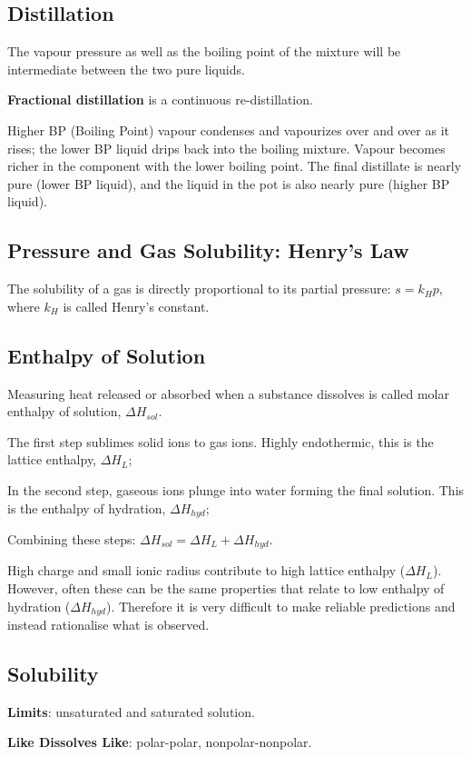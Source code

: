 \documentclass[a4paper,12pt]{article}
\begin{document}
\subsection{Distillation}
The vapour pressure as well as the boiling point of the mixture will be intermediate between the two pure liquids.\par
\textbf{Fractional distillation} is a continuous re-distillation. \par
Higher BP (Boiling Point) vapour condenses and vapourizes over and over as it rises; the lower BP liquid drips back into the boiling mixture.
Vapour becomes richer in the component with the lower boiling point. The final distillate is nearly pure (lower BP liquid), and the liquid in the pot is also nearly pure (higher BP liquid).
\subsection{Pressure and Gas Solubility: Henry's Law}
The solubility of a gas is directly proportional to its partial pressure: $s = k_{H}p$, where $k_{H}$ is called Henry's constant.
\subsection{Enthalpy of Solution}
Measuring heat released or absorbed when a substance dissolves is called molar enthalpy of solution, $\Delta H_{sol}$.\par
The first step sublimes solid ions to gas ions. Highly endothermic, this is the lattice enthalpy, $\Delta H_{L}$;\par
In the second step, gaseous ions plunge into water forming the final solution. This is the enthalpy of hydration, $\Delta H_{hyd}$;\par
Combining these steps: $\Delta H_{sol}=\Delta H_{L}+\Delta H_{hyd}$.\par
High charge and small ionic radius contribute to high lattice enthalpy ($\Delta H_{L}$). However, often these can be the same properties that relate to low enthalpy of hydration ($\Delta H_{hyd}$). Therefore it is very difficult to make reliable predictions and instead rationalise what is observed.
\subsection{Solubility}
\textbf{Limits}: unsaturated and saturated solution.\par
\textbf{Like Dissolves Like}: polar-polar, nonpolar-nonpolar.
\end{document}
